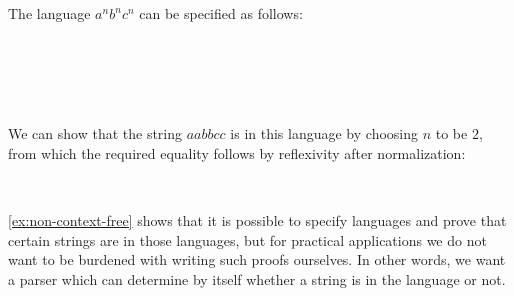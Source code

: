 \begin{example}\label{ex:non-context-free}
The language $a^n b^n c^n$ can be specified as follows:
\begin{code}[hide]%
%
\>[4]\AgdaSpace{}%
\AgdaSymbol{:}\AgdaSpace{}%
\AgdaSpace{}%
\AgdaSpace{}%
\AgdaSpace{}%
\AgdaSpace{}%
\<%
\\
%
\>[4]\AgdaSpace{}%
\AgdaSpace{}%
\AgdaSymbol{\AgdaUnderscore{}}\AgdaSpace{}%
\AgdaSymbol{=}\AgdaSpace{}%
\AgdaInductiveConstructor{[]}\<%
\\
%
\>[4]\AgdaSpace{}%
\AgdaSymbol{(}\AgdaSpace{}%
\AgdaSymbol{)}\AgdaSpace{}%
\AgdaSpace{}%
\AgdaSymbol{=}\AgdaSpace{}%
\AgdaSpace{}%
\AgdaSpace{}%
\AgdaSpace{}%
\AgdaSpace{}%
\<%
\end{code}
\begin{code}%
%
\>[4]\AgdaSpace{}%
\AgdaSymbol{:}\AgdaSpace{}%
\<%
\\
%
\>[4]\AgdaSpace{}%
\AgdaSpace{}%
\AgdaSymbol{=}\AgdaSpace{}%
\AgdaFunction{Σ[}\AgdaSpace{}%
\AgdaSpace{}%
\AgdaSpace{}%
\AgdaSpace{}%
\AgdaFunction{]}\AgdaSpace{}%
\AgdaSpace{}%
\AgdaSpace{}%
\AgdaSpace{}%
\AgdaSpace{}%
\AgdaSpace{}%
\AgdaOperator{\AgdaFunction{++}}\AgdaSpace{}%
\AgdaSpace{}%
\AgdaSpace{}%
\AgdaSpace{}%
\AgdaOperator{\AgdaFunction{++}}\AgdaSpace{}%
\AgdaSpace{}%
\AgdaSpace{}%
\<%
\end{code}
We can show that the string $aabbcc$ is in this language by choosing $n$ to be $2$, from which the required equality follows by reflexivity after normalization:
\begin{code}%
%
\>[4]\AgdaSpace{}%
\AgdaSymbol{:}\AgdaSpace{}%
\AgdaSpace{}%
\<%
\\
%
\>[4]\AgdaSpace{}%
\AgdaSymbol{=}\AgdaSpace{}%
\AgdaSpace{}%
\AgdaOperator{\AgdaInductiveConstructor{,}}\AgdaSpace{}%
\<%
\end{code}
\end{example}
\cref{ex:non-context-free} shows that it is possible to specify languages and prove that certain strings are in those languages, but for practical applications we do not want to be burdened with writing such proofs ourselves.
In other words, we want a parser which can determine by itself whether a string is in the language or not.

